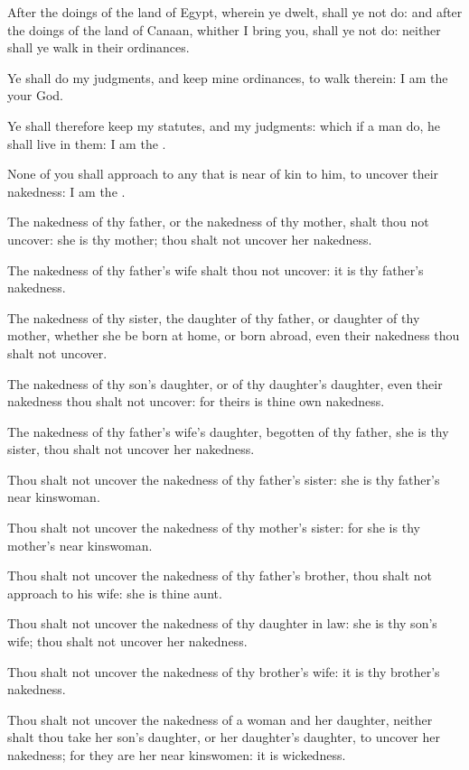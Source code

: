\Verse After the doings of the land of Egypt, wherein ye dwelt, shall ye not do: and after the doings of the land of Canaan, whither I bring you, shall ye not do: neither shall ye walk in their ordinances.

\Verse Ye shall do my judgments, and keep mine ordinances, to walk therein: I am the \LORD your God.

\Verse Ye shall therefore keep my statutes, and my judgments: which if a man do, he shall live in them: I am the \LORD.

\Verse None of you shall approach to any that is near of kin to him, to uncover their nakedness: I am the \LORD.

\Verse The nakedness of thy father, or the nakedness of thy mother, shalt thou not uncover: she is thy mother; thou shalt not uncover her nakedness.

\Verse The nakedness of thy father's wife shalt thou not uncover: it is thy father's nakedness.

\Verse The nakedness of thy sister, the daughter of thy father, or daughter of thy mother, whether she be born at home, or born abroad, even their nakedness thou shalt not uncover.

\Verse The nakedness of thy son's daughter, or of thy daughter's daughter, even their nakedness thou shalt not uncover: for theirs is thine own nakedness.

\Verse The nakedness of thy father's wife's daughter, begotten of thy father, she is thy sister, thou shalt not uncover her nakedness.

\Verse Thou shalt not uncover the nakedness of thy father's sister: she is thy father's near kinswoman.

\Verse Thou shalt not uncover the nakedness of thy mother's sister: for she is thy mother's near kinswoman.

\Verse Thou shalt not uncover the nakedness of thy father's brother, thou shalt not approach to his wife: she is thine aunt.

\Verse Thou shalt not uncover the nakedness of thy daughter in law: she is thy son's wife; thou shalt not uncover her nakedness.

\Verse Thou shalt not uncover the nakedness of thy brother's wife: it is thy brother's nakedness.

\Verse Thou shalt not uncover the nakedness of a woman and her daughter, neither shalt thou take her son's daughter, or her daughter's daughter, to uncover her nakedness; for they are her near kinswomen: it is wickedness.

